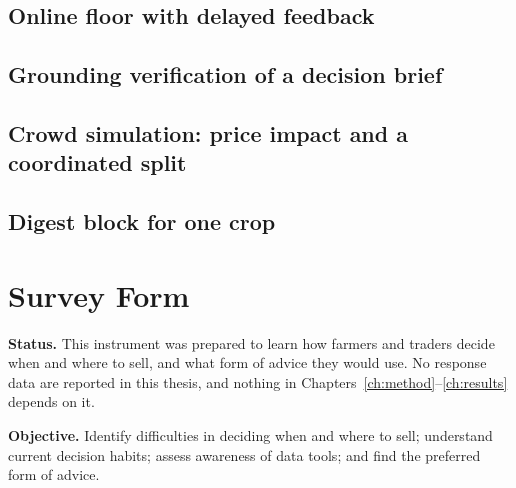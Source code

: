 \section{Online floor with delayed feedback}


\section{Grounding verification of a decision brief}


\section{Crowd simulation: price impact and a coordinated split}


\section{Digest block for one crop}


\chapter{Survey Form}
\label{appendix:survey}

\noindent\textbf{Status.} This instrument was prepared to learn how farmers and traders decide when and where to sell, and what form of advice they would use. No response data are reported in this thesis, and nothing in Chapters~\ref{ch:method}--\ref{ch:results} depends on it.

\noindent\textbf{Objective.} Identify difficulties in deciding when and where to sell; understand current decision habits; assess awareness of data tools; and find the preferred form of advice.

